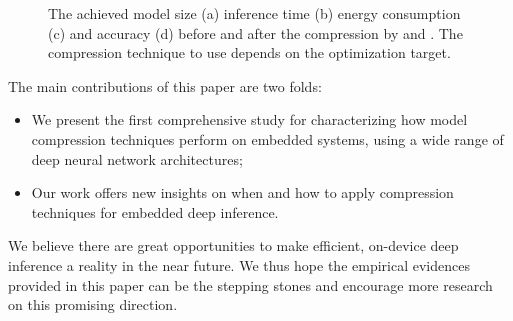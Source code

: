\begin{figure}[!t]
\centering
{}
\hfill
{}
\hfill
{}
\hfill
{}
\hfill
\caption{The achieved model size (a) inference time (b) energy consumption (c) and accuracy (d) before and after the compression by \quantization and \pruning.
The compression technique to use depends on the optimization target.}
\vspace{-4mm}
\label{fig:motivation}
\end{figure}


The main contributions of this paper are two folds:

\begin{itemize}
\item We present the first comprehensive study for characterizing how model compression techniques perform on embedded systems, using a
    wide range of deep neural network architectures;
\item Our work offers new insights on when and how to apply compression techniques for embedded deep inference.
\end{itemize}

We believe there are great opportunities to make efficient, on-device deep inference a reality in the near future. We thus hope the
empirical evidences provided in this paper can be the stepping stones and encourage more research on this promising direction.
